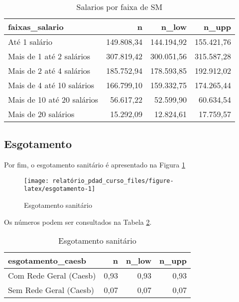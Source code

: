 \documentclass[]{article}
\begin{document}
\begin{table}[!hb]
\centering
\begin{tabular}{lrrr}
  \hline
faixas\_salario & n & n\_low & n\_upp \\ 
  \hline
Até 1 salário & 149.808,34 & 144.194,92 & 155.421,76 \\ 
  Mais de 1 até 2 salários & 307.819,42 & 300.051,56 & 315.587,28 \\ 
  Mais de 2 até 4 salários & 185.752,94 & 178.593,85 & 192.912,02 \\ 
  Mais de 4 até 10 salários & 166.799,10 & 159.332,75 & 174.265,44 \\ 
  Mais de 10 até 20 salários & 56.617,22 & 52.599,90 & 60.634,54 \\ 
  Mais de 20 salários & 15.292,09 & 12.824,61 & 17.759,57 \\ 
   \hline
\end{tabular}
\caption{Salarios por faixa de SM} 
\label{tab:salarios}
\end{table}

\clearpage
\pagebreak

\subsection{Esgotamento}\label{esgotamento}

Por fim, o esgotamento sanitário é apresentado na Figura
\ref{fig:esgotamento}

\begin{figure}[H]
\texttt{[image: relatório\_pdad\_curso\_files/figure-latex/esgotamento-1]} \caption{Esgotamento sanitário \label{fig:esgotamento}}\label{fig:esgotamento}
\end{figure}

Os números podem ser consultados na Tabela \ref{tab:esgotamento}.

\begin{table}[!hb]
\centering
\begin{tabular}{lrrr}
  \hline
esgotamento\_caesb & n & n\_low & n\_upp \\ 
  \hline
Com Rede Geral (Caesb) & 0,93 & 0,93 & 0,93 \\ 
  Sem Rede Geral (Caesb) & 0,07 & 0,07 & 0,07 \\ 
   \hline
\end{tabular}
\caption{Esgotamento sanitário} 
\label{tab:esgotamento}
\end{table}
\end{document}
